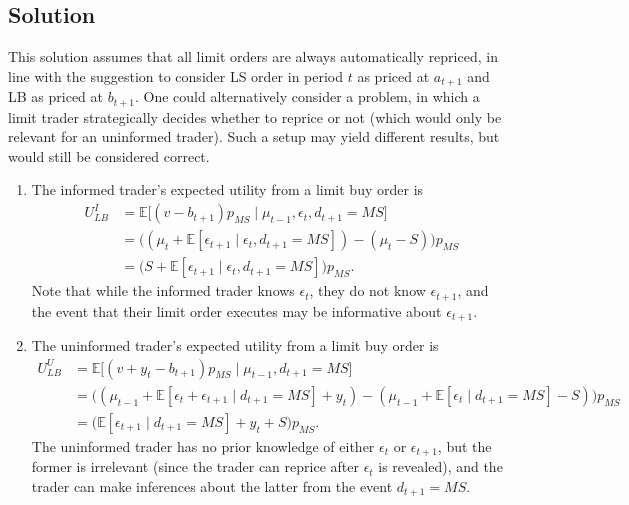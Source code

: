 \documentclass[a4paper]{article}
\newif\ifsolutions
\begin{document}
	


\ifsolutions
\subsection*{Solution}
This solution assumes that all limit orders are always automatically repriced, in line with the suggestion to consider LS order in period $t$ as priced at $a_{t+1}$ and LB as priced at $b_{t+1}$. One could alternatively consider a problem, in which a limit trader strategically decides whether to reprice or not (which would only be relevant for an uninformed trader). Such a setup may yield different results, but would still be considered correct.
\begin{enumerate}
	\item The informed trader's expected utility from a limit buy order is
	\begin{align}
		U^I_{LB}
		&= \mathbb{E}\Big[ (v-b_{t+1}) p_{MS} \mid \mu_{t-1}, \epsilon_t, d_{t+1}=MS \Big]
		\nonumber
		\\
		&= \Big( (\mu_t+ \mathbb{E}[\epsilon_{t+1} \mid \epsilon_t, d_{t+1}=MS]) - (\mu_t-S) \Big) p_{MS} 
		\nonumber
		\\
		&= \Big( S +  \mathbb{E}[\epsilon_{t+1} \mid \epsilon_t, d_{t+1}=MS] \Big) p_{MS}.
		\label{eq:uilb}
	\end{align}
	Note that while the informed trader knows $\epsilon_t$, they do not know $\epsilon_{t+1}$, and the event that their limit order executes may be informative about $\epsilon_{t+1}$.
	
	\item The uninformed trader's expected utility from a limit buy order is
	\begin{align}
		U^U_{LB}
		&= \mathbb{E}\Big[ (v+y_t-b_{t+1}) p_{MS} \mid \mu_{t-1}, d_{t+1}=MS \Big]
		\nonumber
		\\
		&= \Big( (\mu_{t-1} + \mathbb{E}[\epsilon_{t} + \epsilon_{t+1} \mid d_{t+1}=MS] + y_t) - (\mu_{t-1} + \mathbb{E}[\epsilon_{t} \mid d_{t+1}=MS] - S) \Big) p_{MS}
		\nonumber
		\\
		&= \Big( \mathbb{E}[ \epsilon_{t+1} \mid d_{t+1}=MS] + y_t + S \Big) p_{MS}.
		\label{eq:uulb}
	\end{align}
	The uninformed trader has no prior knowledge of either $\epsilon_t$ or $\epsilon_{t+1}$, but the former is irrelevant (since the trader can reprice after $\epsilon_t$ is revealed), and the trader can make inferences about the latter from the event $d_{t+1} = MS$.
	

\end{enumerate}
\end{document}

